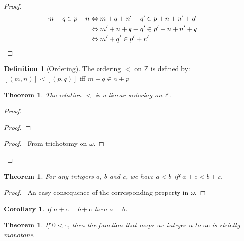 \documentclass{report}
\let\qed\relax
\newtheorem{theorem}[axiom]{Theorem}
\newtheorem{corollary}{Corollary}[axiom]
\theoremstyle{definition}
\newtheorem{definition}[axiom]{Definition}
\begin{document}
    \begin{proof}
        \pf
        \begin{align*}
            m + q \in p + n & \Leftrightarrow m + q + n' + q' \in p + n + n' + q' \\
            & \Leftrightarrow m' + n + q + q' \in p' + n + n' + q \\
            & \Leftrightarrow m' + q' \in p' + n' & \qed
        \end{align*}
    \end{proof}

    \begin{definition}[Ordering]
        The ordering $<$ on $\mathbb{Z}$ is defined by: $[(m,n)] < [(p,q)]$ iff $m + q \in n + p$.
    \end{definition}

    \begin{theorem}
        The relation $<$ is a linear ordering on $\mathbb{Z}$.
    \end{theorem}

    \begin{proof}
        \pf
        \begin{proof}
        \end{proof}
        \begin{proof}
            \pf\ From trichotomy on $\omega$.
        \end{proof}
        \qed
    \end{proof}

    \begin{theorem}
        For any integers $a$, $b$ and $c$, we have $a < b$ iff $a + c < b + c$.
    \end{theorem}

    \begin{proof}
        \pf\ An easy consequence of the corresponding property in $\omega$.
    \end{proof}

    \begin{corollary}
        If $a + c = b + c$ then $a = b$.
    \end{corollary}

    \begin{theorem}
        If $0 < c$, then the function that maps an integer $a$ to $ac$ is strictly monotone.
    \end{theorem}
\end{document}

